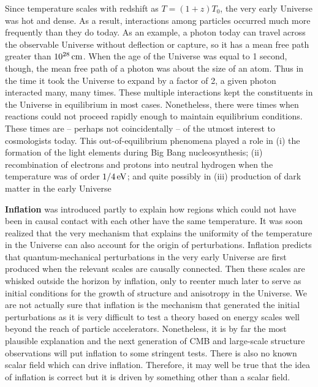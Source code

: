\documentclass[a4paper,11pt]{article}
\begin{document}
Since temperature scales with redshift as $T=(1+z)T_0$, the very early Universe was hot and dense. As a result, interactions among particles occurred much more frequently than they do today. As an example, a photon today can travel across the observable Universe without deflection or capture, so it has a mean free path greater than $10^{28}\,{\rm cm}$. When the age of the Universe was equal to 1 second, though, the mean free path of a photon was about the size of an atom. Thus in the time it took the Universe to expand by a factor of 2, a given photon interacted many, many times. These multiple interactions kept the constituents in the Universe in equilibrium in most cases. Nonetheless, there were times when reactions could not proceed rapidly enough to maintain equilibrium conditions. These times are -- perhaps not coincidentally -- of the utmost interest to cosmologists today. This out-of-equilibrium phenomena played a role in (i) the formation of the light elements during Big Bang nucleosynthesis; (ii) recombination of electrons and protons into neutral hydrogen when the temperature was of order $1/4\,{\rm eV}$; and quite possibly in (iii) production of dark matter in the early Universe

\textbf{Inflation} was introduced partly to explain how regions which could not have been in causal contact with each other have the same temperature. It was soon realized that the very mechanism that explains the uniformity of the temperature in the Universe can also account for the origin of perturbations. Inflation predicts that quantum-mechanical perturbations in the very early Universe are first produced when the relevant scales are causally connected. Then these scales are whisked outside the horizon by inflation, only to reenter much later to serve as initial conditions for the growth of structure and anisotropy in the Universe. We are not actually sure that inflation is the mechanism that generated the initial perturbations as it is very difficult to test a theory based on energy scales well beyond the reach of particle accelerators. Nonetheless, it is by far the most plausible explanation and the next generation of CMB and large-scale structure observations will put inflation to some stringent tests. There is also no known scalar field which can drive inflation. Therefore, it may well be true that the idea of inflation is correct but it is driven by something other than a scalar field.
\end{document}
